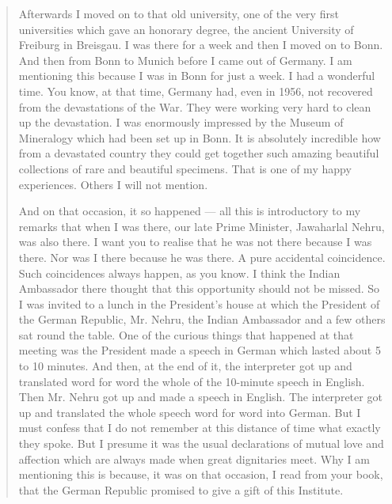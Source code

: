 \begin{quote}
{\newpage

Afterwards I moved on to that old university, one of the very first universities which gave an honorary degree, the ancient University of Freiburg in Breisgau. I was there for a week and then I moved on to Bonn. And then from Bonn to Munich before I came out of Germany. I am mentioning this because I was in Bonn for just a week. I had a wonderful time. You know, at that time, Germany had, even in 1956, not recovered from the devastations of the War. They were working very hard to clean up the devastation. I was enormously impressed by the Museum of Mineralogy which had been set up in Bonn. It is absolutely incredible how from a devastated country they could get together such amazing beautiful collections of rare and beautiful specimens. That is one of my happy experiences. Others I will not mention.

And on that occasion, it so happened --- all this is introductory to my remarks that when I was there, our late Prime Minister, Jawaharlal Nehru, was also there. I want you to realise that he was not there because I was there. Nor was I there because he was there. A pure accidental coincidence. Such coincidences always happen, as you know. I think the Indian Ambassador there thought that this opportunity should not be missed. So I was invited to a lunch in the President's house at which the President of the German Republic, Mr. Nehru, the Indian Ambassador and a few others sat round the table. One of the curious things that happened at that meeting was the President made a speech in German which lasted about 5 to 10 minutes. And then, at the end of it, the interpreter got up and translated word for word the whole of the 10-minute speech in English. Then Mr. Nehru got up and made a speech in English. The interpreter got up and translated the whole speech word for word into German. But I must confess that I do not remember at this distance of time what exactly they spoke. But I presume it was the usual declarations of mutual love and affection which are always made when great dignitaries meet. Why I am mentioning this is because, it was on that occasion, I read from your book, that the German Republic promised to give a gift of this Institute.

}
\end{quote}
